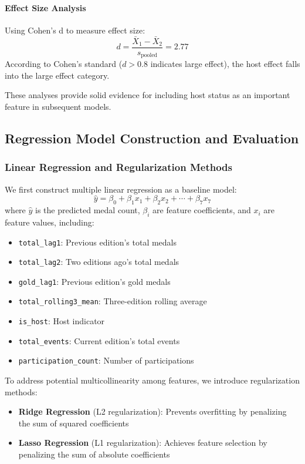 \documentclass{mcmthesis}
\begin{document}
\paragraph{Effect Size Analysis}
Using Cohen's d to measure effect size:
\begin{equation}
    d = \frac{\bar{X}_1 - \bar{X}_2}{s_{\text{pooled}}} = 2.77
\end{equation}
According to Cohen's standard ($d > 0.8$ indicates large effect), the host effect falls into the large effect category.

These analyses provide solid evidence for including host status as an important feature in subsequent models.

\subsection{Regression Model Construction and Evaluation}

\subsubsection{Linear Regression and Regularization Methods}

We first construct multiple linear regression as a baseline model:
\begin{equation}
    \hat{y} = \beta_0 + \beta_1 x_1 + \beta_2 x_2 + \cdots + \beta_7 x_7
\end{equation}
where $\hat{y}$ is the predicted medal count, $\beta_i$ are feature coefficients, and $x_i$ are feature values, including:
\begin{itemize}
    \item \texttt{total\_lag1}: Previous edition's total medals
    \item \texttt{total\_lag2}: Two editions ago's total medals
    \item \texttt{gold\_lag1}: Previous edition's gold medals
    \item \texttt{total\_rolling3\_mean}: Three-edition rolling average
    \item \texttt{is\_host}: Host indicator
    \item \texttt{total\_events}: Current edition's total events
    \item \texttt{participation\_count}: Number of participations
\end{itemize}

To address potential multicollinearity among features, we introduce regularization methods:
\begin{itemize}
    \item \textbf{Ridge Regression} (L2 regularization): Prevents overfitting by penalizing the sum of squared coefficients
    \item \textbf{Lasso Regression} (L1 regularization): Achieves feature selection by penalizing the sum of absolute coefficients
\end{itemize}
\end{document}
